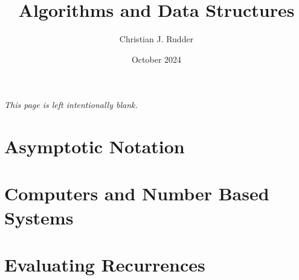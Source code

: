 \documentclass{memoir}
\title{Algorithms and Data Structures}
\author{Christian J. Rudder}
\date{October 2024}
\begin{document}
\maketitle
\setcounter{tocdepth}{2}

\tableofcontents

\newpage
\thispagestyle{empty}
\mbox{}
\vfill
\begin{center}
    \textit{This page is left intentionally blank.}
\end{center}
\vfill
\newpage


\chapter{Asymptotic Notation}

\chapter{Computers and Number Based Systems}




\chapter{Evaluating Recurrences}

\end{document}
